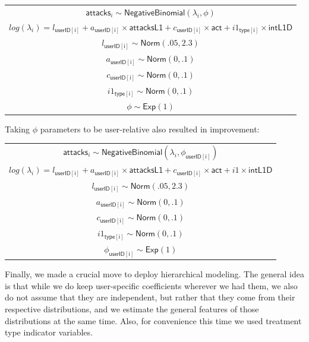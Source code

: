 \documentclass[preprint,12pt]{elsarticle}
\begin{document}
\begin{center}
\begin{tabular}{c}
$\mathsf{attacks}_i  \sim  \textsf{NegativeBinomial}(\lambda_i, \phi)$\\ 
$    log(\lambda_i)   =  l_{\mathsf{userID[i]}} + a_{\mathsf{userID[i]}} \times \mathsf{attacksL1} + c_{\mathsf{userID[i]}} \times \mathsf{act} +
      i1_{\mathsf{type[i]}} \times \mathsf{intL1D}$\\ 
$    l_{\mathsf{userID[i]}}  \sim  \textsf{Norm}(.05,2.3)$\\
$    a_{\mathsf{userID[i]}}  \sim \textsf{Norm}(0,.1)$\\
$    c_{\mathsf{userID[i]}}  \sim  \textsf{Norm}(0,.1) $\\
$    i1_{\mathsf{type[i]}}  \sim  \textsf{Norm}(0,.1) $\\
$    \phi  \sim \mathsf{Exp}(1)$
\end{tabular}
\end{center}

\normalsize

Taking \(\phi\) parameters to be user-relative also resulted in
improvement:


\footnotesize


\begin{center}
\begin{tabular}{c}
$\mathsf{attacks}_i  \sim  \textsf{NegativeBinomial}(\lambda_i, \phi_{\mathsf{userID[i]}} )$\\
$    log(\lambda_i)   =  l_{\mathsf{userID[i]}} + a_{\mathsf{userID[i]}} \times \mathsf{attacksL1} + c_{\mathsf{userID[i]}} \times \mathsf{act} + i1 \times \mathsf{intL1D}$\\
$    l_{\mathsf{userID[i]}}  \sim  \textsf{Norm}(.05,2.3)$\\
$    a_{\mathsf{userID[i]}}  \sim \textsf{Norm}(0,.1)$\\
$    c_{\mathsf{userID[i]}}  \sim  \textsf{Norm}(0,.1)$ \\
$    i1_{\mathsf{type[i]}}  \sim  \textsf{Norm}(0,.1)$ \\
$    \phi_{\mathsf{userID[i]}}   \sim \mathsf{Exp}(1)$
\end{tabular}
\end{center}


\normalsize

Finally, we made a crucial move to deploy hierarchical modeling. The
general idea is that while we do keep user-specific coefficients
wherever we had them, we also do not assume that they are independent,
but rather that they come from their respective distributions, and we
estimate the general features of those distributions at the same time.
Also, for convenience this time we used treatment type indicator
variables.
\end{document}
